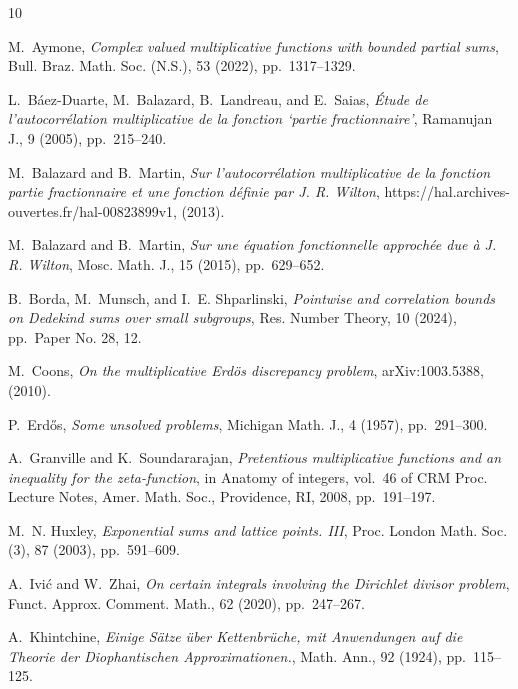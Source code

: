 \documentclass[a4paper,12pt, reqn0]{amsart}
\theoremstyle{remark}
\begin{document}
\begin{thebibliography}{10}

{\sc M.~Aymone}, {\em Complex valued multiplicative functions with bounded
  partial sums}, Bull. Braz. Math. Soc. (N.S.), 53 (2022), pp.~1317--1329.

{\sc L.~B\'{a}ez-Duarte, M.~Balazard, B.~Landreau, and E.~Saias}, {\em
  \'{E}tude de l'autocorr\'{e}lation multiplicative de la fonction `partie
  fractionnaire'}, Ramanujan J., 9 (2005), pp.~215--240.

{\sc M.~Balazard and B.~Martin}, {\em Sur l'autocorr\'{e}lation multiplicative
  de la fonction partie fractionnaire et une fonction d\'{e}finie par {J}. {R}.
  {W}ilton}, https://hal.archives-ouvertes.fr/hal-00823899v1,  (2013).

{\sc M.~Balazard and B.~Martin}, {\em Sur une \'{e}quation fonctionnelle
  approch\'{e}e due \`a {J}. {R}. {W}ilton}, Mosc. Math. J., 15 (2015),
  pp.~629--652.

{\sc B.~Borda, M.~Munsch, and I.~E. Shparlinski}, {\em Pointwise and
  correlation bounds on {D}edekind sums over small subgroups}, Res. Number
  Theory, 10 (2024), pp.~Paper No. 28, 12.

{\sc M.~Coons}, {\em On the multiplicative {E}rd\"{o}s discrepancy problem},
  arXiv:1003.5388,  (2010).

{\sc P.~Erd\H{o}s}, {\em Some unsolved problems}, Michigan Math. J., 4 (1957),
  pp.~291--300.

{\sc A.~Granville and K.~Soundararajan}, {\em Pretentious multiplicative
  functions and an inequality for the zeta-function}, in Anatomy of integers,
  vol.~46 of CRM Proc. Lecture Notes, Amer. Math. Soc., Providence, RI, 2008,
  pp.~191--197.

{\sc M.~N. Huxley}, {\em Exponential sums and lattice points. {III}}, Proc.
  London Math. Soc. (3), 87 (2003), pp.~591--609.

{\sc A.~Ivi\'{c} and W.~Zhai}, {\em On certain integrals involving the
  {D}irichlet divisor problem}, Funct. Approx. Comment. Math., 62 (2020),
  pp.~247--267.

{\sc A.~Khintchine}, {\em Einige {S{\"a}tze} {\"u}ber {Kettenbr{\"u}che}, mit
  {Anwendungen} auf die {Theorie} der {Diophantischen} {Approximationen}.},
  Math. Ann., 92 (1924), pp.~115--125.


\end{thebibliography}
\end{document}
